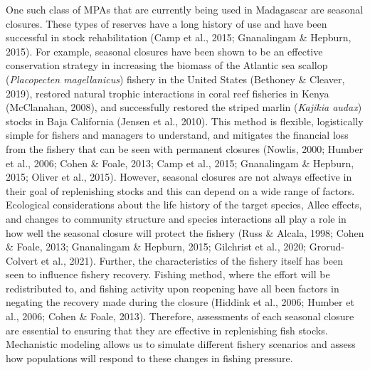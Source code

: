 \documentclass[
]{article}
\begin{document}
One such class of MPAs that are currently being used in Madagascar are seasonal closures. These types of reserves have a long history of use and have been successful in stock rehabilitation (Camp et al., 2015; Gnanalingam \& Hepburn, 2015). For example, seasonal closures have been shown to be an effective conservation strategy in increasing the biomass of the Atlantic sea scallop (\emph{Placopecten magellanicus}) fishery in the United States (Bethoney \& Cleaver, 2019), restored natural trophic interactions in coral reef fisheries in Kenya (McClanahan, 2008), and successfully restored the striped marlin (\emph{Kajikia audax}) stocks in Baja California (Jensen et al., 2010). This method is flexible, logistically simple for fishers and managers to understand, and mitigates the financial loss from the fishery that can be seen with permanent closures (Nowlis, 2000; Humber et al., 2006; Cohen \& Foale, 2013; Camp et al., 2015; Gnanalingam \& Hepburn, 2015; Oliver et al., 2015). However, seasonal closures are not always effective in their goal of replenishing stocks and this can depend on a wide range of factors. Ecological considerations about the life history of the target species, Allee effects, and changes to community structure and species interactions all play a role in how well the seasonal closure will protect the fishery (Russ \& Alcala, 1998; Cohen \& Foale, 2013; Gnanalingam \& Hepburn, 2015; Gilchrist et al., 2020; Grorud-Colvert et al., 2021). Further, the characteristics of the fishery itself has been seen to influence fishery recovery. Fishing method, where the effort will be redistributed to, and fishing activity upon reopening have all been factors in negating the recovery made during the closure (Hiddink et al., 2006; Humber et al., 2006; Cohen \& Foale, 2013). Therefore, assessments of each seasonal closure are essential to ensuring that they are effective in replenishing fish stocks. Mechanistic modeling allows us to simulate different fishery scenarios and assess how populations will respond to these changes in fishing pressure.
\end{document}
